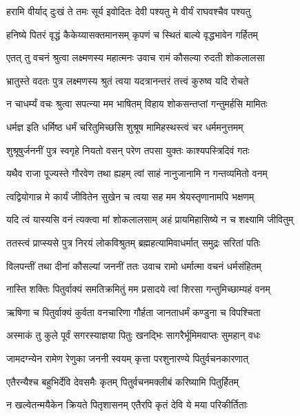 \twolineshloka
{हरामि वीर्याद् दुःखं ते तमः सूर्य इवोदितः}
{देवी पश्यतु मे वीर्यं राघवश्चैव पश्यतु} %

\twolineshloka
{हनिष्ये पितरं वृद्धं कैकेय्यासक्तमानसम्}
{कृपणं च स्थितं बाल्ये वृद्धभावेन गर्हितम्} %

\twolineshloka
{एतत् तु वचनं श्रुत्वा लक्ष्मणस्य महात्मनः}
{उवाच रामं कौसल्या रुदती शोकलालसा} %

\twolineshloka
{भ्रातुस्ते वदतः पुत्र लक्ष्मणस्य श्रुतं त्वया}
{यदत्रानन्तरं तत्त्वं कुरुष्व यदि रोचते} %

\twolineshloka
{न चाधर्म्यं वचः श्रुत्वा सपत्न्या मम भाषितम्}
{विहाय शोकसन्तप्तां गन्तुमर्हसि मामितः} %

\twolineshloka
{धर्मज्ञ इति धर्मिष्ठ धर्मं चरितुमिच्छसि}
{शुश्रूष मामिहस्थस्त्वं चर धर्ममनुत्तमम्} %

\twolineshloka
{शुश्रूषुर्जननीं पुत्र स्वगृहे नियतो वसन्}
{परेण तपसा युक्तः काश्यपस्त्रिदिवं गतः} %

\twolineshloka
{यथैव राजा पूज्यस्ते गौरवेण तथा ह्यहम्}
{त्वां साहं नानुजानामि न गन्तव्यमितो वनम्} %

\twolineshloka
{त्वद्वियोगान्न मे कार्यं जीवितेन सुखेन च}
{त्वया सह मम श्रेयस्तृणानामपि भक्षणम्} %

\twolineshloka
{यदि त्वं यास्यसि वनं त्यक्त्वा मां शोकलालसाम्}
{अहं प्रायमिहासिष्ये न च शक्ष्यामि जीवितुम्} %

\twolineshloka
{ततस्त्वं प्राप्स्यसे पुत्र निरयं लोकविश्रुतम्}
{ब्रह्महत्यामिवाधर्मात् समुद्रः सरितां पतिः} %

\twolineshloka
{विलपन्तीं तथा दीनां कौसल्यां जननीं ततः}
{उवाच रामो धर्मात्मा वचनं धर्मसंहितम्} %

\twolineshloka
{नास्ति शक्तिः पितुर्वाक्यं समतिक्रमितुं मम}
{प्रसादये त्वां शिरसा गन्तुमिच्छाम्यहं वनम्} %

\twolineshloka
{ऋषिणा च पितुर्वाक्यं कुर्वता वनचारिणा}
{गौर्हता जानताधर्मं कण्डुना च विपश्चिता} %

\twolineshloka
{अस्माकं तु कुले पूर्वं सगरस्याज्ञया पितुः}
{खनद्भिः सागरैर्भूमिमवाप्तः सुमहान् वधः} %

\twolineshloka
{जामदग्न्येन रामेण रेणुका जननी स्वयम्}
{कृत्ता परशुनारण्ये पितुर्वचनकारणात्} %

\twolineshloka
{एतैरन्यैश्च बहुभिर्देवि देवसमैः कृतम्}
{पितुर्वचनमक्लीबं करिष्यामि पितुर्हितम्} %

\twolineshloka
{न खल्वेतन्मयैकेन क्रियते पितृशासनम्}
{एतैरपि कृतं देवि ये मया परिकीर्तिताः} %

